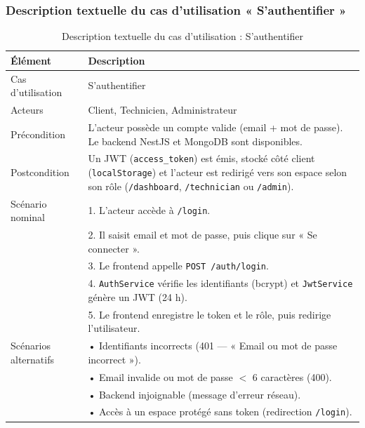 
\subsubsection{Description textuelle du cas d'utilisation « S'authentifier »}

\begin{table}[H]
\centering
\footnotesize
\renewcommand{\arraystretch}{0.8}
\setlength{\tabcolsep}{4pt}
\begin{tabular}{|p{3cm}|p{9cm}|}
\hline
\textbf{Élément} & \textbf{Description} \\
\hline
Cas d'utilisation & S'authentifier \\
\hline
Acteurs & Client, Technicien, Administrateur \\
\hline
Précondition & L'acteur possède un compte valide (email + mot de passe). Le backend NestJS et MongoDB sont disponibles. \\
\hline
Postcondition & Un JWT (\texttt{access\_token}) est émis, stocké côté client (\texttt{localStorage}) et l'acteur est redirigé vers son espace selon son rôle (\texttt{/dashboard}, \texttt{/technician} ou \texttt{/admin}). \\
\hline
Scénario nominal &
1. L'acteur accède à \texttt{/login}.\\
& 2. Il saisit email et mot de passe, puis clique sur « Se connecter ».\\
& 3. Le frontend appelle \texttt{POST /auth/login}.\\
& 4. \texttt{AuthService} vérifie les identifiants (bcrypt) et \texttt{JwtService} génère un JWT (24 h).\\
& 5. Le frontend enregistre le token et le rôle, puis redirige l'utilisateur.\\
\hline
Scénarios alternatifs &
• Identifiants incorrects (401 — « Email ou mot de passe incorrect »).\\
& • Email invalide ou mot de passe $<$ 6 caractères (400).\\
& • Backend injoignable (message d'erreur réseau).\\
& • Accès à un espace protégé sans token (redirection \texttt{/login}).\\
\hline
\end{tabular}
\caption{Description textuelle du cas d'utilisation : S'authentifier}
\label{tab:cu-auth}
\end{table}

